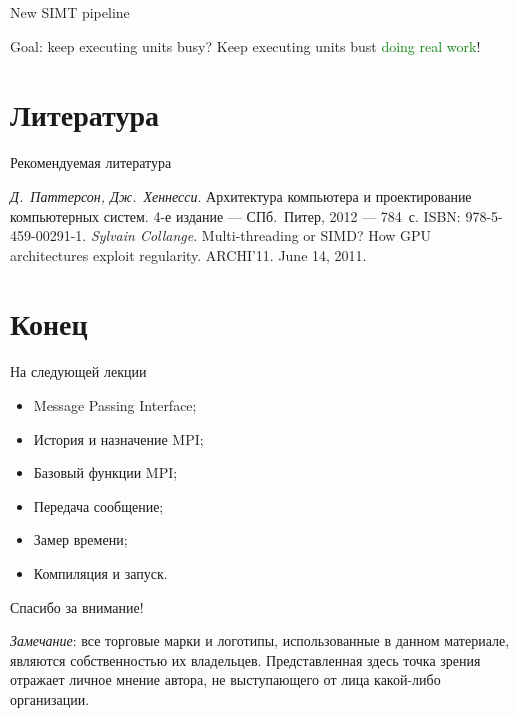 \begin{frame}{New SIMT pipeline}
\centering
{}
\end{frame}

\begin{frame}
Goal: keep executing units busy?
\pause\vfill
Keep executing units bust \textcolor{green}{doing real work}!
\end{frame}

\section*{Литература}

\begin{frame}{Рекомендуемая литература}
\begin{thebibliography}{99}
    \bibitem{} \textit{Д.~Паттерсон, Дж.~Хеннесси}. Архитектура компьютера и
    проектирование компьютерных систем. 4-е издание --- СПб.~Питер, 2012 ---
    784~с. ISBN: 978-5-459-00291-1.
    \bibitem{} \textit{Sylvain Collange}. Multi-threading or SIMD? How GPU
    architectures exploit regularity. ARCHI'11. June 14, 2011.
    \end{thebibliography}
\end{frame}

\section*{Конец}

\begin{frame}{На следующей лекции}
\begin{itemize}
\ifsbertech
    \item Message Passing Interface;
    \item История и назначение MPI;
    \item Базовый функции MPI;
    \item Передача сообщение;
    \item Замер времени;
    \item Компиляция и запуск.
\fi
\end{itemize}
\end{frame}

\begin{frame}

{\huge{Спасибо за внимание!}\par}

\vfill

\tiny{\textit{Замечание}: все торговые марки и логотипы, использованные в данном материале, являются собственностью их владельцев. Представленная здесь точка зрения отражает личное мнение автора, не выступающего от лица какой-либо организации.}

\end{frame}


